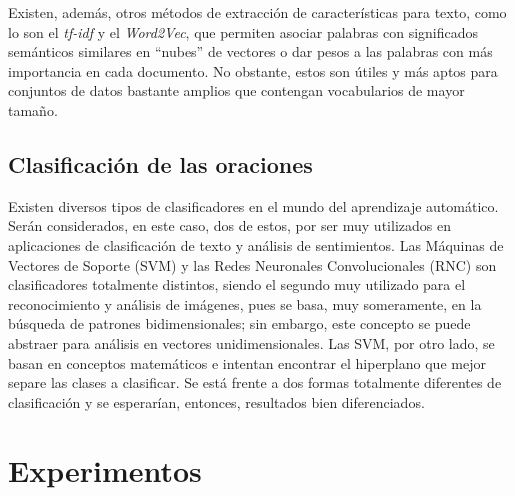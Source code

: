\documentclass[conference]{IEEEtran}
\begin{document}
        Existen, además, otros métodos de extracción de características para texto, como lo son el \textit{tf-idf} y el \textit{Word2Vec}, que permiten asociar palabras con significados semánticos similares en ``nubes'' de vectores o dar pesos a las palabras con más importancia en cada documento. No obstante, estos son útiles y más aptos para conjuntos de datos bastante amplios que contengan vocabularios de mayor tamaño.
    
    
    
    
    \subsection{Clasificación de las oraciones}
    
        Existen diversos tipos de clasificadores en el mundo del aprendizaje automático. Serán considerados, en este caso, dos de estos, por ser muy utilizados en aplicaciones de clasificación de texto y análisis de sentimientos. Las Máquinas de Vectores de Soporte (SVM) y las Redes Neuronales Convolucionales (RNC) son clasificadores totalmente distintos, siendo el segundo muy utilizado para el reconocimiento y análisis de imágenes, pues se basa, muy someramente, en la búsqueda de patrones bidimensionales; sin embargo, este concepto se puede abstraer para análisis en vectores unidimensionales. Las SVM, por otro lado, se basan en conceptos matemáticos e intentan encontrar el hiperplano que mejor separe las clases a clasificar. Se está frente a dos formas totalmente diferentes de clasificación y se esperarían, entonces, resultados bien diferenciados.
    
    



\section{Experimentos} \label{sec:experimentos}
\end{document}
